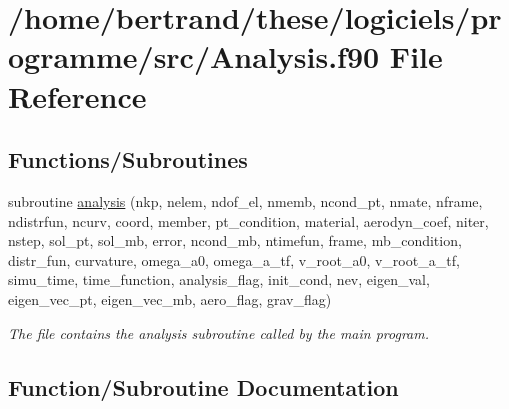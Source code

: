 \hypertarget{_analysis_8f90}{}\section{/home/bertrand/these/logiciels/programme/src/\+Analysis.f90 File Reference}
\label{_analysis_8f90}
\subsection*{Functions/\+Subroutines}
\begin{DoxyCompactItemize}
\item 
subroutine \hyperlink{_analysis_8f90_aaee5e32aa3983fc7dd592bc71d7d5494}{analysis} (nkp, nelem, ndof\+\_\+el, nmemb, ncond\+\_\+pt, nmate, nframe, ndistrfun, ncurv, coord, member, pt\+\_\+condition, material, aerodyn\+\_\+coef, niter, nstep, sol\+\_\+pt, sol\+\_\+mb, error, ncond\+\_\+mb, ntimefun, frame, mb\+\_\+condition, distr\+\_\+fun, curvature, omega\+\_\+a0, omega\+\_\+a\+\_\+tf, v\+\_\+root\+\_\+a0, v\+\_\+root\+\_\+a\+\_\+tf, simu\+\_\+time, time\+\_\+function, analysis\+\_\+flag, init\+\_\+cond, nev, eigen\+\_\+val, eigen\+\_\+vec\+\_\+pt, eigen\+\_\+vec\+\_\+mb, aero\+\_\+flag, grav\+\_\+flag)
\begin{DoxyCompactList}\small\item\em The file contains the analysis subroutine called by the main program. \end{DoxyCompactList}\end{DoxyCompactItemize}


\subsection{Function/\+Subroutine Documentation}
\mbox{\label{_analysis_8f90_aaee5e32aa3983fc7dd592bc71d7d5494}} 
